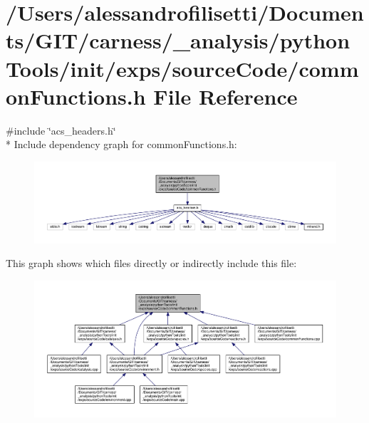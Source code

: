 \hypertarget{a00058}{\section{/\+Users/alessandrofilisetti/\+Documents/\+G\+I\+T/carness/\+\_\+analysis/python\+Tools/init/exps/source\+Code/common\+Functions.h File Reference}
\label{a00058}
}
{\ttfamily \#include \char`\"{}acs\+\_\+headers.\+h\char`\"{}}\\*
Include dependency graph for common\+Functions.\+h\+:\nopagebreak
\begin{figure}[H]
\begin{center}
\leavevmode
\includegraphics[width=350pt]{a00174}
\end{center}
\end{figure}
This graph shows which files directly or indirectly include this file\+:\nopagebreak
\begin{figure}[H]
\begin{center}
\leavevmode
\includegraphics[width=350pt]{a00175}
\end{center}
\end{figure}
